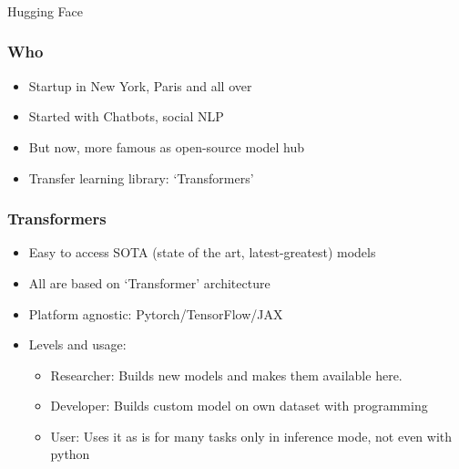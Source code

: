 
\begin{frame}[fragile]\frametitle{}
\begin{center}
{\Large Hugging Face}
\end{center}
\end{frame}

\begin{frame}[fragile]\frametitle{Who}
		\begin{itemize}
		\item Startup in New York, Paris and all over
		\item Started with Chatbots, social NLP
		\item But now, more famous as open-source model hub
		\item Transfer learning library: `Transformers'
		\end{itemize}
\end{frame}

\begin{frame}[fragile]\frametitle{Transformers}
		\begin{itemize}
		\item Easy to access SOTA (state of the art, latest-greatest) models
		\item All are based on ‘Transformer’ architecture
		\item Platform agnostic: Pytorch/TensorFlow/JAX
		\item Levels and usage:
				\begin{itemize}
				\item Researcher: Builds new models and makes them available here.
				\item Developer: Builds custom model on own dataset with programming
				\item User: Uses it as is for many tasks only in inference mode, not even with python
				\end{itemize}

		\end{itemize}
\end{frame}

